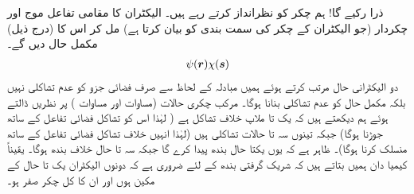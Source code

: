 ذرا رکیے گا!   ہم چکر کو نظرانداز کرتے رہے ہیں۔ الیکٹران کا مقامی  تفاعل موج   اور      چکردار (جو الیکٹران کے چکر کی سمت بندی کو بیان کرتا ہے) مل کر اس کا  (درج ذیل)  مکمل حال دیں گے۔
\begin{align}
	\psi({{\boldsymbol{r}}})\chi({{\boldsymbol{s}}})
\end{align}
دو الیکٹرانی حال مرتب کرتے  ہوئے ہمیں  مبادلہ کے لحاظ سے   صرف فضائی جزو کو عدم تشاکلی  نہیں   بلکہ  مکمل حال  کو   عدم تشاکلی بنانا ہوگا۔ مرکب چکری حالات (مساوات   اور مساوات )   پر نظریں ڈالتے ہوئے ہم دیکھتے ہیں کہ یک تا ملاپ خلاف تشاکل ہے ( لہٰذا اس کو تشاکل فضائی تفاعل کے ساتھ جوڑنا ہوگا)  جبکہ تینوں  سہ تا حالات تشاکلی ہیں (لہٰذا انہیں خلاف تشاکل فضائی تفاعل کے ساتھ منسلک کرنا ہوگا)۔ ظاہر ہے کہ یوں یکتا حال بندھ   پیدا کرے گا جبکہ سہ تا حال خلاف بندھ  ہوگا۔ یقیناً  کیمیا دان  ہمیں بتاتے ہیں کہ شریک گرفتی بندھ کے لئے ضروری ہے کہ دونوں الیکٹران یک تا حال کے مکین ہوں اور  ان کا کل چکر صفر ہو۔



